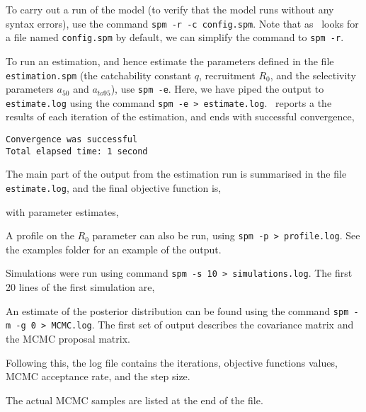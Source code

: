 To carry out a run of the model (to verify that the model runs without any syntax errors), use the command \texttt{spm -r -c config.spm}. Note that as \SPM\ looks for a file named \texttt{config.spm} by default, we can simplify the command to \texttt{spm -r}. 

To run an estimation, and hence estimate the parameters defined in the file \texttt{estimation.spm} (the catchability constant $q$, recruitment $R_0$, and the selectivity parameters $a_{50}$ and $a_{to95}$), use  \texttt{spm -e}. Here, we have piped the output to \texttt{estimate.log} using the command \texttt{spm -e > estimate.log}.  \SPM\ reports a the results of each iteration of the estimation, and ends with successful convergence,
{\small{\begin{verbatim}
Convergence was successful
Total elapsed time: 1 second
\end{verbatim}}}

The main part of the output from the estimation run is summarised in the file \texttt{estimate.log}, and the final objective function is,
 
with parameter estimates,
 

A profile on the $R_0$ parameter can also be run, using \texttt{spm -p > profile.log}. See the examples folder for an example of the output.

Simulations were run using command \texttt{spm -s 10 > simulations.log}. The first 20 lines of the first simulation are,
 

An estimate of the posterior distribution can be found using the command \texttt{spm -m -g 0 > MCMC.log}. The first set of output describes the covariance matrix and the MCMC proposal matrix.


Following this, the log file contains the iterations, objective functions values, MCMC acceptance rate, and the step size.


The actual MCMC samples are listed at the end of the file.


